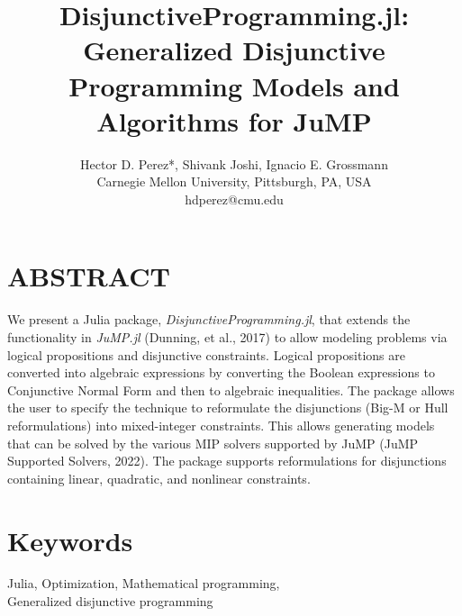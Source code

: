 \documentclass{juliacon}
\begin{document}
\title{DisjunctiveProgramming.jl: Generalized Disjunctive Programming Models and Algorithms for JuMP}
\author{
  \large Hector D. Perez*, Shivank Joshi, Ignacio E. Grossmann
  \\\normalsize Carnegie Mellon University, Pittsburgh, PA, USA  
  \\\normalsize	*hdperez@cmu.edu
}

\maketitle

\section*{ABSTRACT}
\label{sec:abstract}
We present a Julia package, \textit{DisjunctiveProgramming.jl}, that extends the functionality in \textit{JuMP.jl} (Dunning, et al., 2017) to allow modeling problems via logical propositions and disjunctive constraints. Logical propositions are converted into algebraic expressions by converting the Boolean expressions to Conjunctive Normal Form and then to algebraic inequalities. The package allows the user to specify the technique to reformulate the disjunctions (Big-M or Hull reformulations) into mixed-integer constraints. This allows generating models that can be solved by the various MIP solvers supported by JuMP (JuMP Supported Solvers, 2022). The package supports reformulations for disjunctions containing linear, quadratic, and nonlinear constraints.

\section*{Keywords}
Julia, Optimization, Mathematical programming, \\ Generalized disjunctive programming
\end{document}
